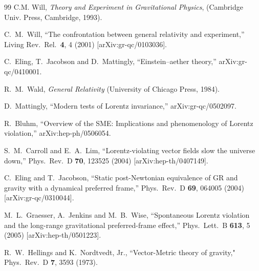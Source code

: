 \documentclass[aps,prd,preprint,amsmath,amssymb]{revtex4}
\begin{document}
\begin{thebibliography}{99}
%
C.M. Will, {\it Theory and Experiment in Gravitational
Physics}, (Cambridge Univ. Press, Cambridge, 1993).

C.~M.~Will,
``The confrontation between general relativity and experiment,''
Living Rev.\ Rel.\  {\bf 4}, 4 (2001)
[arXiv:gr-qc/0103036].

  C.~Eling, T.~Jacobson and D.~Mattingly,
  ``Einstein--aether theory,''
  arXiv:gr-qc/0410001.

R.~M.~Wald, {\it General Relativity}
(University of Chicago Press, 1984).

  D.~Mattingly,
  ``Modern tests of Lorentz invariance,''
  arXiv:gr-qc/0502097.

  R.~Bluhm,
  ``Overview of the SME: Implications and phenomenology of Lorentz violation,''
  arXiv:hep-ph/0506054.

S.~M.~Carroll and E.~A.~Lim,
``Lorentz-violating vector fields slow the universe down,''
Phys.\ Rev.\ D {\bf 70}, 123525 (2004)
[arXiv:hep-th/0407149].

C.~Eling and T.~Jacobson,
``Static post-Newtonian equivalence of GR and gravity with a dynamical
preferred frame,''
Phys.\ Rev.\ D {\bf 69}, 064005 (2004)
[arXiv:gr-qc/0310044].

  M.~L.~Graesser, A.~Jenkins and M.~B.~Wise,
  ``Spontaneous Lorentz violation and the long-range gravitational
  preferred-frame effect,''
  Phys.\ Lett.\ B {\bf 613}, 5 (2005)
  [arXiv:hep-th/0501223].

    R.~W.~Hellings and K.~Nordtvedt, Jr.,
    ``Vector-Metric theory of
    gravity,"
    Phys.\ Rev.\ D {\bf 7}, 3593 (1973).


\end{thebibliography}
\end{document}
